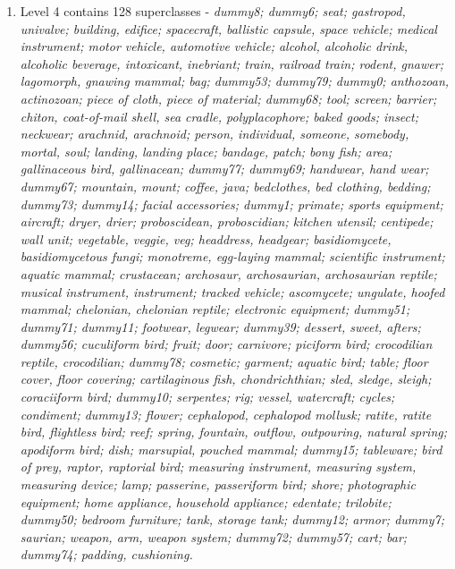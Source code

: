 \documentclass[runningheads]{llncs}
\begin{document}
\begin{enumerate}
    \item Level 4 contains 128 superclasses - \textit{dummy8; dummy6; seat; gastropod, univalve; building, edifice; spacecraft, ballistic capsule, space vehicle; medical instrument; motor vehicle, automotive vehicle; alcohol, alcoholic drink, alcoholic beverage, intoxicant, inebriant; train, railroad train; rodent, gnawer; lagomorph, gnawing mammal; bag; dummy53; dummy79; dummy0; anthozoan, actinozoan; piece of cloth, piece of material; dummy68; tool; screen; barrier; chiton, coat-of-mail shell, sea cradle, polyplacophore; baked goods; insect; neckwear; arachnid, arachnoid; person, individual, someone, somebody, mortal, soul; landing, landing place; bandage, patch; bony fish; area; gallinaceous bird, gallinacean; dummy77; dummy69; handwear, hand wear; dummy67; mountain, mount; coffee, java; bedclothes, bed clothing, bedding; dummy73; dummy14; facial accessories; dummy1; primate; sports equipment; aircraft; dryer, drier; proboscidean, proboscidian; kitchen utensil; centipede; wall unit; vegetable, veggie, veg; headdress, headgear; basidiomycete, basidiomycetous fungi; monotreme, egg-laying mammal; scientific instrument; aquatic mammal; crustacean; archosaur, archosaurian, archosaurian reptile; musical instrument, instrument; tracked vehicle; ascomycete; ungulate, hoofed mammal; chelonian, chelonian reptile; electronic equipment; dummy51; dummy71; dummy11; footwear, legwear; dummy39; dessert, sweet, afters; dummy56; cuculiform bird; fruit; door; carnivore; piciform bird; crocodilian reptile, crocodilian; dummy78; cosmetic; garment; aquatic bird; table; floor cover, floor covering; cartilaginous fish, chondrichthian; sled, sledge, sleigh; coraciiform bird; dummy10; serpentes; rig; vessel, watercraft; cycles; condiment; dummy13; flower; cephalopod, cephalopod mollusk; ratite, ratite bird, flightless bird; reef; spring, fountain, outflow, outpouring, natural spring; apodiform bird; dish; marsupial, pouched mammal; dummy15; tableware; bird of prey, raptor, raptorial bird; measuring instrument, measuring system, measuring device; lamp; passerine, passeriform bird; shore; photographic equipment; home appliance, household appliance; edentate; trilobite; dummy50; bedroom furniture; tank, storage tank; dummy12; armor; dummy7; saurian; weapon, arm, weapon system; dummy72; dummy57; cart; bar; dummy74; padding, cushioning.}
    

\end{enumerate}
\end{document}
